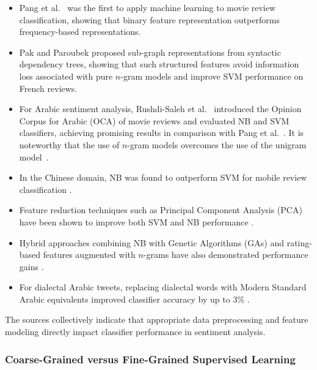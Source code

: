 \documentclass[a4paper,twoside,12pt]{book}
\begin{document}
\begin{itemize}
	\item Pang et al.~\cite{Pang2002thumbs} was the first to apply machine learning to movie review classification, showing that binary feature representation outperforms frequency-based representations.
	
	\item Pak and Paroubek \cite{Pak2011ClassificationEP} proposed sub-graph representations from syntactic dependency trees, showing that such structured features avoid information loss associated with pure $n$-gram models and improve SVM performance on French reviews.
	
	\item For Arabic sentiment analysis, Rushdi-Saleh et al.~\cite{Rushdi2011opinion} introduced the Opinion Corpus for Arabic (OCA) of movie reviews and evaluated NB and SVM classifiers, achieving promising results in comparison with Pang et al.~\cite{Pang2002thumbs}. It is noteworthy that the use of $n$-gram models overcomes the use of the unigram model~\cite{Rushdi2011opinion}.
	
	\item In the Chinese domain, NB was found to outperform SVM for mobile review classification \cite{Zhang2014sentiment}. 
	
	\item Feature reduction techniques such as Principal Component Analysis (PCA) have been shown to improve both SVM and NB performance \cite{Vinodhini2013effect}. 
	
	\item Hybrid approaches combining NB with Genetic Algorithms (GAs) and rating-based features augmented with $n$-grams have also demonstrated performance gains \cite{Govindarajan2013SentimentAO}. 
	
	\item For dialectal Arabic tweets, replacing dialectal words with Modern Standard Arabic equivalents improved classifier accuracy by up to 3\% \cite{Duwairi2015sentiment}.
\end{itemize}

The sources collectively indicate that appropriate data preprocessing and feature modeling directly impact classifier performance in sentiment analysis.

\subsubsection{Coarse-Grained versus Fine-Grained Supervised Learning}
\end{document}
